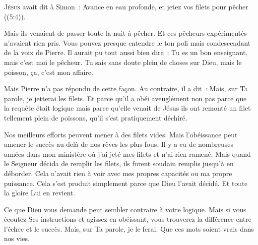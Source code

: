 



\lettrine{J}{ésus} avait dit à Simon~:
 \og Avance en eau profonde, et jetez vos filets pour pêcher \fg{}
 ((5:4)).

Mais ils venaient de passer toute la nuit à pêcher.
 Et ces pêcheurs expérimentés n'avaient rien pris.
 Vous pouvez presque entendre le ton poli mais condescendant
 de la voix de Pierre. Il aurait pu tout aussi bien dire~: 
 \og Tu es un bon enseignant, mais c'est moi le pêcheur.
 Tu sais sans doute plein de choses sur Dieu, mais le poisson,
 ça, c'est mon affaire. \fg{}


Mais Pierre n'a pas répondu de cette façon.
 Au contraire, il a dit~: 
 \og Mais, sur Ta parole, je jetterai les filets. \fg{}
 Et parce qu'il a obéi aveuglément \ocadr non pas parce que la requête était
 logique mais parce qu'elle venait de Jésus \fcadr{}
 ils ont remonté un filet tellement plein de poissons,
 qu'il s'est pratiquement déchiré.

Nos meilleurs efforts peuvent mener à des filets vides.
 Mais l'obéissance peut amener le succès au-delà de nos rêves les plus fous.
 Il y a eu de nombreuses années dans mon ministère où j'ai jeté mes filets
 et n'ai rien ramené. Mais quand le Seigneur décida de remplir les filets,
 ils furent soudain remplis jusqu'à en déborder.
 Cela n'avait rien à voir avec mes propres capacités ou ma propre puissance.
 Cela s'est produit simplement parce que Dieu l'avait décidé.
 Et toute la gloire Lui en revient.

Ce que Dieu vous demande peut sembler contraire à votre logique.
 Mais si vous écoutez Ses instructions et agissez en obéissant,
 vous trouverez la différence entre l'échec et le succès.
 \og Mais, sur Ta parole, je le ferai. \fg{}
 Que ces mots soient vrais dans nos vies.

\dvrule



